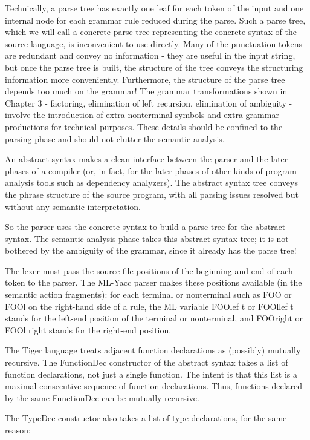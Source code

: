 \documentclass[8pt, a4paper, oneside, twocolumn]{extarticle}
\begin{document}
Technically, a parse tree has exactly one leaf for each token of the input and one internal node for each
grammar rule reduced during the parse.
Such a parse tree, which we will call a concrete parse tree representing the
concrete syntax of the source language, is inconvenient to use directly. Many
of the punctuation tokens are redundant and convey no information - they are
useful in the input string, but once the parse tree is built, the structure of the
tree conveys the structuring information more conveniently.
Furthermore, the structure of the parse tree depends too much on the 
grammar! The grammar transformations shown in Chapter 3 - factoring, 
elimination of left recursion, elimination of ambiguity - involve the introduction of
extra nonterminal symbols and extra grammar productions for technical 
purposes. These details should be confined to the parsing phase and should not
clutter the semantic analysis.

An abstract syntax makes a clean interface between the parser and the
later phases of a compiler (or, in fact, for the later phases of other kinds of
program-analysis tools such as dependency analyzers). The abstract syntax
tree conveys the phrase structure of the source program, with all parsing 
issues resolved but without any semantic interpretation.

So the parser uses the 
concrete syntax to build a parse tree for the abstract syntax.
The semantic analysis phase takes this abstract syntax tree; it is not bothered by
the ambiguity of the grammar, since it already has the parse tree!

The lexer must pass the source-file positions of the beginning and end of
each token to the parser. The ML-Yacc parser makes these positions available
(in the semantic action fragments): for each terminal or nonterminal such as
FOO or FOOl on the right-hand side of a rule, the ML variable FOOlef t or
FOOllef t stands for the left-end position of the terminal or nonterminal, and
FOOright or FOOl right stands for the right-end position.

The Tiger language treats adjacent function declarations as (possibly) 
mutually recursive. The FunctionDec constructor of the abstract syntax takes
a list of function declarations, not just a single function. The intent is that
this list is a maximal consecutive sequence of function declarations. Thus,
functions declared by the same FunctionDec can be mutually recursive.

The TypeDec constructor also takes a list of type declarations, for the
same reason;
\end{document}
